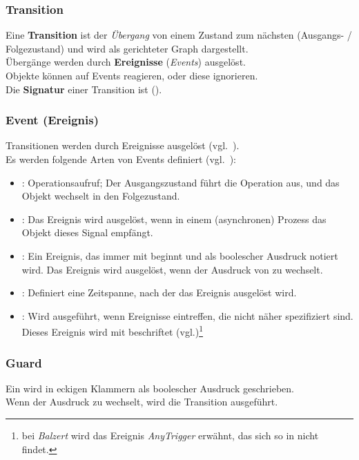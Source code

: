 \subsubsection*{Transition}
Eine \textbf{Transition} ist der \textit{Übergang} von einem Zustand zum nächsten (Ausgangs- / Folgezustand) und wird als gerichteter Graph dargestellt.\\

\noindent
Übergänge werden durch \textbf{Ereignisse} (\textit{Events}) ausgelöst.\\
Objekte können auf Events reagieren, oder diese ignorieren.\\

\noindent
Die \textbf{Signatur} einer Transition ist  (\cite[321]{OMG17}).

\subsubsection*{Event (Ereignis)}
Transitionen werden durch Ereignisse ausgelöst (vgl.~\cite[91]{Bal05}).\\
Es werden folgende Arten von Events definiert (vgl.~\cite[69]{Buh09}):

\begin{itemize}
    \item {}: Operationsaufruf; Der Ausgangszustand führt die Operation aus, und das Objekt wechselt in den Folgezustand.
    \item {}: Das Ereignis wird ausgelöst, wenn in einem (asynchronen) Prozess das Objekt dieses Signal empfängt.
    \item {}: Ein Ereignis, das immer mit  beginnt und als boolescher Ausdruck notiert wird. Das Ereignis wird ausgelöst, wenn der Ausdruck von  zu  wechselt.
    \item {}: Definiert eine Zeitspanne, nach der das Ereignis ausgelöst wird.
    \item {}: Wird ausgeführt, wenn Ereignisse eintreffen, die nicht näher spezifiziert sind. Dieses Ereignis wird mit  beschriftet (vgl.\cite[293]{OMG17})\footnote{bei \textit{Balzert} wird das Ereignis \textit{AnyTrigger} erwähnt, das sich so in \cite{OMG17} nicht findet.}
\end{itemize}

\subsubsection*{Guard}
Ein  wird in eckigen Klammern als boolescher Ausdruck geschrieben.\\
Wenn der Ausdruck zu  wechselt, wird die Transition ausgeführt.

